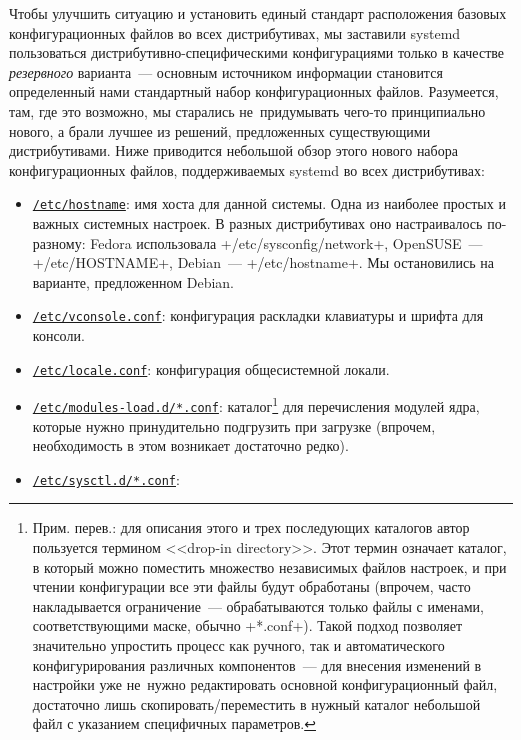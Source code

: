 \documentclass[10pt,oneside,a4paper]{article}
\newcommand{\hreftt}[2]{\href{#1}{\texttt{#2}}}
\begin{document}
Чтобы улучшить ситуацию и установить единый стандарт расположения базовых
конфигурационных файлов во всех дистрибутивах, мы заставили systemd пользоваться
дистрибутивно-специфическими конфигурациями только в качестве \emph{резервного}
варианта~--- основным источником информации становится определенный нами
стандартный набор конфигурационных файлов. Разумеется, там, где это возможно, мы
старались не~придумывать чего-то принципиально нового, а брали лучшее из
решений, предложенных существующими дистрибутивами. Ниже приводится небольшой
обзор этого нового набора конфигурационных файлов, поддерживаемых systemd во
всех дистрибутивах:
\begin{itemize}
	\item
		\hreftt{http://0pointer.de/public/systemd-man/hostname.html}{/etc/hostname}:
		имя хоста для данной системы. Одна из наиболее простых и важных
		системных настроек. В разных дистрибутивах оно настраивалось
		по-разному: Fedora использовала +/etc/sysconfig/network+,
		OpenSUSE~--- +/etc/HOSTNAME+, Debian~--- +/etc/hostname+. Мы
		остановились на варианте, предложенном Debian.
	\item
		\hreftt{http://0pointer.de/public/systemd-man/vconsole.conf.html}{/etc/vconsole.conf}:
		конфигурация раскладки клавиатуры и шрифта для консоли.
	\item
		\hreftt{http://0pointer.de/public/systemd-man/locale.conf.html}{/etc/locale.conf}:
		конфигурация общесистемной локали.
	\item
		\hreftt{http://0pointer.de/public/systemd-man/modules-load.d.html}{/etc/modules-load.d/*.conf}:
		каталог\footnote{Прим. перев.: для описания этого и трех
		последующих каталогов автор пользуется термином <<drop-in
		directory>>. Этот термин означает каталог, в который можно
		поместить множество независимых файлов настроек, и при чтении
		конфигурации все эти файлы будут обработаны (впрочем, часто
		накладывается ограничение~--- обрабатываются только файлы с
		именами, соответствующими маске, обычно +*.conf+). Такой подход
		позволяет значительно упростить процесс как ручного, так и
		автоматического конфигурирования различных компонентов~--- для
		внесения изменений в настройки уже не~нужно редактировать
		основной конфигурационный файл, достаточно лишь
		скопировать/переместить в нужный каталог небольшой файл с
		указанием специфичных параметров.} для перечисления модулей
		ядра, которые нужно принудительно подгрузить при загрузке
		(впрочем, необходимость в этом возникает достаточно редко).
	\item
		\hreftt{http://0pointer.de/public/systemd-man/sysctl.d.html}{/etc/sysctl.d/*.conf}:

\end{itemize}
\end{document}
